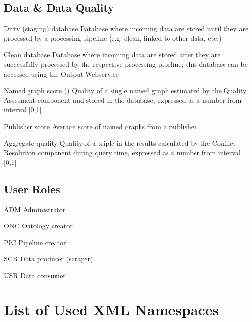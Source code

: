 \section*{Data \& Data Quality}
\begin{glossarylist}
	\item[Dirty (staging) database] Database where incoming data are stored until they are processed by a processing pipeline (e.g. clean, linked to other data, etc.)
	\item[Clean database] Database where incoming data are stored after they are successfully processed by the respective processing pipeline; this database can be accessed using the Output Webservice
	\item[Named graph score (\code{odcs:score})] Quality of a single named graph estimated by the Quality Assesment component and stored in the database, expressed as a number from interval [0,1]
	\item[Publisher score] Average score of named graphs from a publisher
	\item[Aggregate quality] Quality of a triple in the results calculated by the Conflict Resolution component during query time, expressed as a number from interval [0,1]
\end{glossarylist}

\section*{User Roles}
\begin{glossarylist}
	\item[ADM] Administrator
	\item[ONC] Ontology creator
	\item[PIC] Pipeline creator
	\item[SCR] Data producer (scraper)
	\item[USR] Data consumer
\end{glossarylist}

\chapter{List of Used XML Namespaces}

